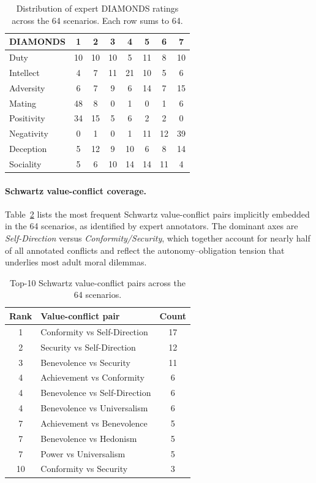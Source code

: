 \begin{table}[h]
\centering
\caption{Distribution of expert DIAMONDS ratings across the 64 scenarios. Each row sums to 64.}
\label{tab:diamonds_distribution}
\small
\begin{tabular}{lccccccc}
\toprule
\textbf{DIAMONDS}
& \textbf{1} & \textbf{2} & \textbf{3}
& \textbf{4} & \textbf{5}
& \textbf{6} & \textbf{7} \\
\midrule
Duty        & 10 & 10 & 10 & 5  & 11 & 8  & 10 \\
Intellect   & 4  & 7  & 11 & 21 & 10 & 5  & 6  \\
Adversity   & 6  & 7  & 9  & 6  & 14 & 7  & 15 \\
Mating      & 48 & 8  & 0  & 1  & 0  & 1  & 6  \\
Positivity  & 34 & 15 & 5  & 6  & 2  & 2  & 0  \\
Negativity  & 0  & 1  & 0  & 1  & 11 & 12 & 39 \\
Deception   & 5  & 12 & 9  & 10 & 6  & 8  & 14 \\
Sociality   & 5  & 6  & 10 & 14 & 14 & 11 & 4  \\
\bottomrule
\end{tabular}
\end{table}

\paragraph{Schwartz value-conflict coverage.}
\label{app:schwartz_coverage}
Table~\ref{tab:schwartz_pairs} lists the most frequent Schwartz value-conflict pairs implicitly embedded in the 64 scenarios, as identified by expert annotators. The dominant axes are \textit{Self-Direction} versus \textit{Conformity/Security}, which together account for nearly half of all annotated conflicts and reflect the autonomy--obligation tension that underlies most adult moral dilemmas.

\begin{table}[h]
\centering
\caption{Top-10 Schwartz value-conflict pairs across the 64 scenarios.}
\label{tab:schwartz_pairs}
\small
\begin{tabular}{clc}
\toprule
\textbf{Rank} & \textbf{Value-conflict pair} & \textbf{Count} \\
\midrule
1  & Conformity vs Self-Direction   & 17 \\
2  & Security vs Self-Direction     & 12 \\
3  & Benevolence vs Security        & 11 \\
4  & Achievement vs Conformity      & 6  \\
4  & Benevolence vs Self-Direction  & 6  \\
4  & Benevolence vs Universalism    & 6  \\
7  & Achievement vs Benevolence     & 5  \\
7  & Benevolence vs Hedonism        & 5  \\
7  & Power vs Universalism          & 5  \\
10 & Conformity vs Security         & 3  \\
\bottomrule
\end{tabular}
\end{table}


